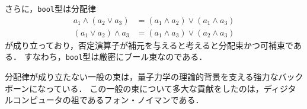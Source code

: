 \documentclass{jsbook}
\newcommand{\ccode}[1]{\texttt{#1}}
\begin{document}
さらに，\ccode{bool}型は分配律
\begin{align}
a_1\wedge(a_2\vee a_3)&=(a_1\wedge a_2)\vee(a_1\wedge a_3)\\
(a_1\vee a_2)\wedge a_3&=(a_1\wedge a_3)\vee(a_2\wedge a_3)
\end{align}
が成り立っており，否定演算子が補元を与えると考えると分配束かつ可補束である．
すなわち，\ccode{bool}型は厳密にブール束なのである．

分配律が成り立たない一般の束は，量子力学の理論的背景を支える強力なバックボーンになっている．
この一般の束について多大な貢献をしたのは，ディジタルコンピュータの祖であるフォン・ノイマンである．
\end{document}
